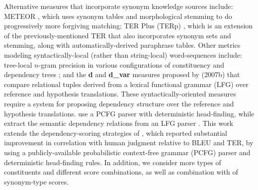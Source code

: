\documentclass{kluwer}    %
\begin{document}
\begin{article}
Alternative measures that 
incorporate synonym knowledge sources include: METEOR
\cite{banerjee05meteor}, which uses synonym tables and
morphological stemming to do progressively more forgiving matching;
TER Plus (TERp) \cite{snover09terp}, which is an extension of the
previously-mentioned TER that also incorporates synonym sets and stemming, along
with automatically-derived paraphrase tables.  
%
Other metrics modeling syntactically-local (rather than string-local)
word-sequences include: tree-local
$n$-gram precision in various configurations of constituency and
dependency trees \cite{liu05syntaxformteval};
and the \textbf{d} and
\textbf{d\_var} measures proposed by 
(2007b) 
that compare relational tuples derived from a
lexical functional grammar (LFG)
over reference and hypothesis translations.
%
These syntactically-oriented measures require a system for proposing
dependency structure over the reference and hypothesis
translations.  use a
PCFG parser with deterministic head-finding, while 
 extract the semantic dependency
relations from an LFG parser \cite{cahill04lfg}.
%
This work extends the dependency-scoring strategies of
, which reported substantial
improvement in correlation with human judgment relative to BLEU and
TER, by using a 
publicly-available probabilistic context-free grammar (PCFG) parser and deterministic head-finding rules. In addition, we consider more types of constituents and different score combinations, as well as combination with of synonym-type scores.
 

\end{article}
\end{document}
